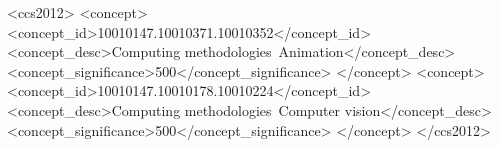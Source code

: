 \documentclass[acmtog]{acmart}
\begin{document}
\renewcommand\shortauthors{Cheng and Cun, et al.}

\begin{abstract}

\end{abstract}



%
%


\begin{CCSXML}
<ccs2012>
   <concept>
       <concept_id>10010147.10010371.10010352</concept_id>
       <concept_desc>Computing methodologies~Animation</concept_desc>
       <concept_significance>500</concept_significance>
       </concept>
   <concept>
       <concept_id>10010147.10010178.10010224</concept_id>
       <concept_desc>Computing methodologies~Computer vision</concept_desc>
       <concept_significance>500</concept_significance>
       </concept>
 </ccs2012>
\end{CCSXML}



%
%




\maketitle
\end{document}
